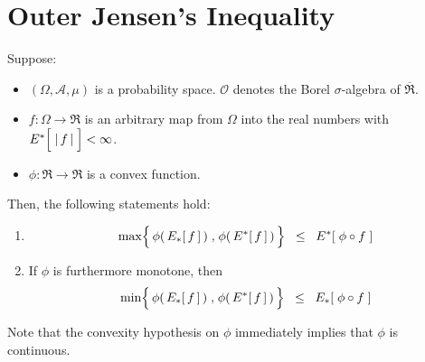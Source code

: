 

\section{Outer Jensen's Inequality}
\setcounter{theorem}{0}
\setcounter{equation}{0}


\renewcommand{\theenumi}{\roman{enumi}}
\renewcommand{\labelenumi}{\textnormal{(\theenumi)}$\;\;$}


\begin{theorem}
\mbox{}\vskip 0.1cm
\noindent
Suppose:
\begin{itemize}
\item
	$(\Omega,\mathcal{A},\mu)$ is a probability space.
	$\mathcal{O}$ denotes the Borel $\sigma$-algebra of $\overline{\Re}$.
\item
	$f : \Omega \longrightarrow \Re$ is an arbitrary map from $\Omega$ into the real numbers
	with $E^{*}\!\left[\;\vert\,\overset{{\color{white}.}}{f}\,\vert\;\right] < \infty$.
\item
	$\phi : \Re \longrightarrow \Re$ is a convex function.
\end{itemize}
Then, the following statements hold:
\begin{enumerate}
\item
	\begin{equation*}
	\max\!\left\{\, \phi(\,E_{*}\!\left[\,f\,\right]\,) \;\overset{{\color{white}\vert}}{,}\; \phi(\,E^{*}\!\left[\,f\,\right]\,) \,\right\}
	\;\; \leq \;\;
		E^{*}\!\left[\;\phi \circ f\;\right] 
	\end{equation*}
\item
	If $\phi$ is furthermore monotone, then
	\begin{equation*}
	\min\!\left\{\, \phi(\,E_{*}\!\left[\,f\,\right]\,) \;\overset{{\color{white}\vert}}{,}\; \phi(\,E^{*}\!\left[\,f\,\right]\,) \,\right\}
	\;\; \leq \;\;
		E_{*}\!\left[\;\phi \circ f\;\right] 
	\end{equation*}
\end{enumerate}
\end{theorem}
\proof
Note that the convexity hypothesis on $\phi$ immediately implies that $\phi$ is continuous.
